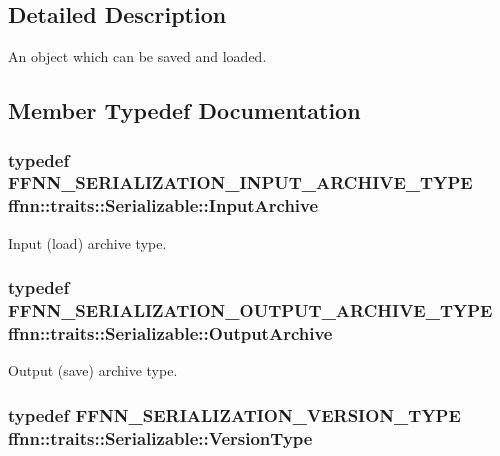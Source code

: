 \subsection{Detailed Description}
An object which can be saved and loaded. 

\subsection{Member Typedef Documentation}
\hypertarget{classffnn_1_1traits_1_1_serializable_a6e626759259f8f370dd4303b4441a234}{
\subsubsection[{Input\-Archive}]{\setlength{\rightskip}{0pt plus 5cm}typedef {\bf F\-F\-N\-N\-\_\-\-S\-E\-R\-I\-A\-L\-I\-Z\-A\-T\-I\-O\-N\-\_\-\-I\-N\-P\-U\-T\-\_\-\-A\-R\-C\-H\-I\-V\-E\-\_\-\-T\-Y\-P\-E} {\bf ffnn\-::traits\-::\-Serializable\-::\-Input\-Archive}}}\label{classffnn_1_1traits_1_1_serializable_a6e626759259f8f370dd4303b4441a234}


Input (load) archive type. 

\hypertarget{classffnn_1_1traits_1_1_serializable_a08d986df75d363fa79506d4f6045cb9f}{
\subsubsection[{Output\-Archive}]{\setlength{\rightskip}{0pt plus 5cm}typedef {\bf F\-F\-N\-N\-\_\-\-S\-E\-R\-I\-A\-L\-I\-Z\-A\-T\-I\-O\-N\-\_\-\-O\-U\-T\-P\-U\-T\-\_\-\-A\-R\-C\-H\-I\-V\-E\-\_\-\-T\-Y\-P\-E} {\bf ffnn\-::traits\-::\-Serializable\-::\-Output\-Archive}}}\label{classffnn_1_1traits_1_1_serializable_a08d986df75d363fa79506d4f6045cb9f}


Output (save) archive type. 

\hypertarget{classffnn_1_1traits_1_1_serializable_a08924b3b7d20cb3cb6eafe517d4f7b30}{
\subsubsection[{Version\-Type}]{\setlength{\rightskip}{0pt plus 5cm}typedef {\bf F\-F\-N\-N\-\_\-\-S\-E\-R\-I\-A\-L\-I\-Z\-A\-T\-I\-O\-N\-\_\-\-V\-E\-R\-S\-I\-O\-N\-\_\-\-T\-Y\-P\-E} {\bf ffnn\-::traits\-::\-Serializable\-::\-Version\-Type}}}\label{classffnn_1_1traits_1_1_serializable_a08924b3b7d20cb3cb6eafe517d4f7b30}



